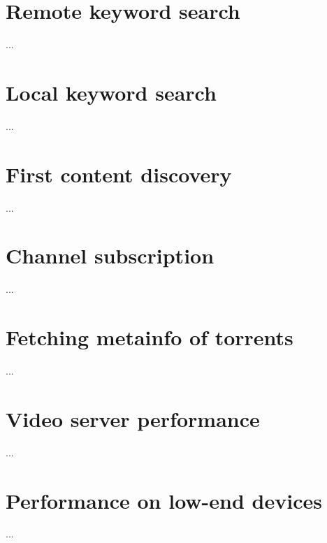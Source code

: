 \section{Remote keyword search}
...

\section{Local keyword search}
...

\section{First content discovery}
...

\section{Channel subscription}
...

\section{Fetching metainfo of torrents}
...

\section{Video server performance}
...

\section{Performance on low-end devices}
...